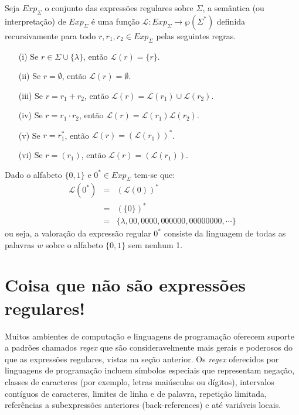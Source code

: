 \begin{definicao}\label{def:ExpRegularesSemantica}
	Seja $Exp_\Sigma$ o conjunto das expressões regulares sobre $\Sigma$,  a semântica (ou interpretação) de $Exp_\Sigma$ é uma função $\mathcal{L}: Exp_\Sigma \rightarrow \wp(\Sigma^*)$ definida recursivamente para todo $r, r_1, r_2  \in Exp_\Sigma$ pelas seguintes regras.
	\begin{itemize}
		\item[(i)] Se $r \in \Sigma \cup \{\lambda\}$, então $\mathcal{L}(r) = \{r\}$.
		\item[(ii)] Se $r = \emptyset$, então $\mathcal{L}(r) = \emptyset$.
		\item[(iii)] Se $r = r_1 + r_2$, então $\mathcal{L}(r) = \mathcal{L}(r_1) \cup \mathcal{L}(r_2)$.
		\item[(iv)] Se $r = r_1 \cdot r_2$, então $\mathcal{L}(r) = \mathcal{L}(r_1)\mathcal{L}(r_2)$.
		\item[(v)] Se $r = r_1^*$, então $\mathcal{L}(r) = (\mathcal{L}(r_1))^*$.
		\item[(vi)] Se $r = (r_1)$, então $\mathcal{L}(r) = (\mathcal{L}(r_1))$.	
	\end{itemize}
\end{definicao}

\begin{exemplo}\label{exe:ValoracaoExpressao1}
	Dado o alfabeto $\{0,1\}$ e $0^* \in Exp_\Sigma$ tem-se que:
	\begin{eqnarray*}
		\mathcal{L}(0^*) & = & (\mathcal{L}(0))^*\\
		& = & (\{0\})^*\\
		& = & \{\lambda, 00, 0000, 000000, 00000000, \cdots\}
	\end{eqnarray*}
	ou seja, a valoração da expressão regular $0^*$ consiste da linguagem de todas as palavras $w$ sobre o alfabeto $\{0,1\}$ sem nenhum 1.
\end{exemplo}

\section{Coisa que não são expressões regulares!}

Muitos ambientes de computação e linguagens de programação oferecem suporte a padrões chamados \textit{regex} que são consideravelmente mais gerais e poderosos do que as expressões regulares, vistas na seção anterior. Os \textit{regex} oferecidos por linguagens de programação incluem símbolos especiais que representam negação, classes de caracteres (por exemplo, letras maiúsculas ou dígitos), intervalos contíguos de caracteres, limites de linha e de palavra, repetição limitada, referências a subexpressões anteriores (back-references) e até variáveis locais. 


